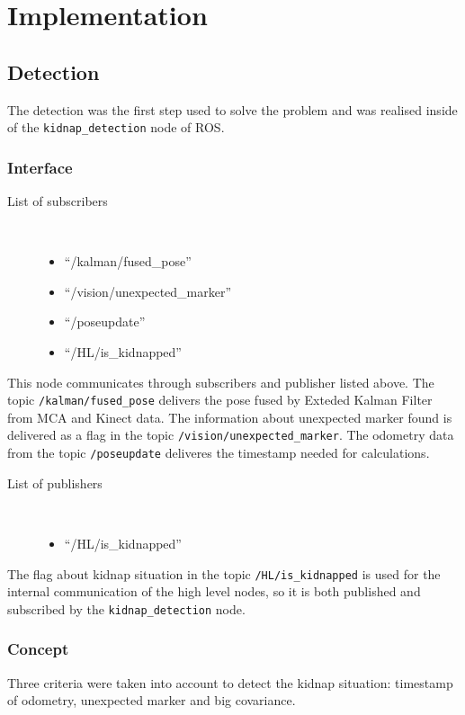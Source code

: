 \section{Implementation} \label{implementation}
\subsection{Detection}
The detection was the first step used to solve the problem and was realised inside of the \texttt{kidnap\_detection} node of ROS. 

\subsubsection{Interface}
\begin{description}
\item[List of subscribers]\
	\begin{itemize}
	\item ``/kalman/fused\_pose'' 
	\item ``/vision/unexpected\_marker'' 
	\item ``/poseupdate'' 
	\item ``/HL/is\_kidnapped''
	\end{itemize}
\end{description}

This node communicates through subscribers and publisher listed above. The topic \texttt{/kalman/fused\_pose} delivers the pose fused by Exteded Kalman Filter from MCA and Kinect data. The information about unexpected marker found is delivered as a flag in the topic \texttt{/vision/unexpected\_marker}. The odometry data from the topic \texttt{/poseupdate} deliveres the timestamp needed for calculations. 

\begin{description}
\item[List of publishers]\
	\begin{itemize}
	\item ``/HL/is\_kidnapped''
	\end{itemize}
\end{description}

The flag about kidnap situation in the topic \texttt{/HL/is\_kidnapped} is used for the internal communication of the high level nodes, so it is both published and subscribed by the \texttt{kidnap\_detection} node.

\subsubsection{Concept}
Three criteria were taken into account to detect the kidnap situation: timestamp of odometry, unexpected marker and big covariance.

